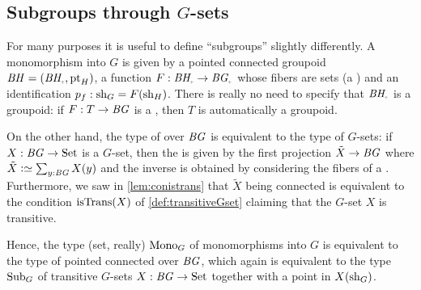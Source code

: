\subsection{Subgroups through $G$-sets}

For many purposes it is useful to define ``subgroups'' slightly differently.
A monomorphism into $G$ is given by a pointed connected groupoid  $\BH=(\BH_\div,\pt_H)$, a function $F:\BH_\div\to\BG_\div$ whose fibers are sets (a \covering) and an identification $p_f:\mathrm{sh}_G=F(\mathrm{sh}_H)$.  There is really no need to specify that $\BH_\div$ is a groupoid: if $F:T\to \mathit{B}\mathit{G}$ is a \covering, then $T$ is automatically a groupoid.  

On the other hand,  the type of \coverings over $\mathit{B}\mathit{G}$ is equivalent to the type of $G$-sets: if $X:\mathit{B}\mathit{G}\to\mathrm{Set}$ is a $G$-set, then the \covering is given by the first projection $\tilde X\to \mathit{B}\mathit{G}$ where $\tilde X\defequi\sum_{y:\BG}X(y)$ and the inverse is obtained by considering the fibers of a \covering.  Furthermore, we saw in \cref{lem:conistrans} that $\tilde X$ being connected is equivalent to the condition $\istrans(X)$ of \cref{def:transitiveGset} claiming that the $G$-set $X$ is transitive. 

Hence, the type (set, really) $\mathrm{Mono}_G$ of monomorphisms into $G$ is equivalent to the type of pointed connected \coverings over $\mathit{B}\mathit{G}$, which again is equivalent to the type $\mathrm{Sub}_G$ of transitive $G$-sets $X:\mathit{B}\mathit{G}\to\mathrm{Set}$ together with a point in $X(\mathrm{sh}_G)$.

